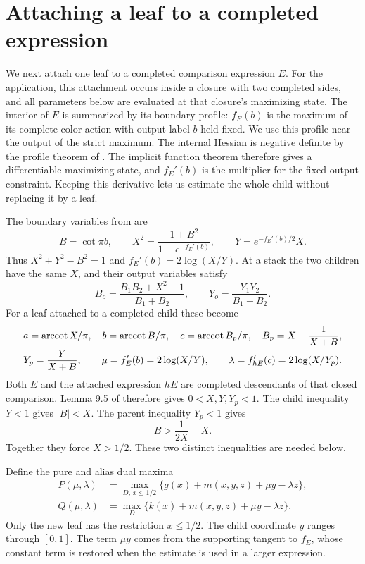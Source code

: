 \section{Attaching a leaf to a completed expression}\label{cs:attachment}

We next attach one leaf to a completed comparison expression $E$.
For the application, this attachment occurs inside a closure with two
completed sides, and all parameters below are evaluated at that
closure's maximizing state.
The interior of $E$ is summarized by its boundary profile: $f_E(b)$ is
the maximum of its complete-color action with output label $b$ held
fixed. We use this profile near the output of the strict maximum.
The internal Hessian is negative definite by the profile theorem of
\cite{Newton}. The implicit function theorem therefore gives a
differentiable maximizing state, and $f_E'(b)$ is the multiplier for
the fixed-output constraint. Keeping this derivative lets us estimate
the whole child without replacing it by a leaf.

The boundary variables from \cite[Section 9]{Newton} are
\[
 B=\cot\pi b,\qquad
 X^2=\frac{1+B^2}{1+e^{-f_E'(b)}},\qquad
 Y=e^{-f_E'(b)/2}X.
\]
Thus $X^2+Y^2-B^2=1$ and $f_E'(b)=2\log(X/Y)$. At a stack the two children have the same $X$, and their output variables satisfy
\[
 B_o=\frac{B_1B_2+X^2-1}{B_1+B_2},
 \qquad Y_o=\frac{Y_1Y_2}{B_1+B_2}.
\]
For a leaf attached to a completed child these become
\begin{equation}\label{cs:attachment-parameters}
 \begin{gathered}
 a=\operatorname{arccot} X/\pi,\quad b=\operatorname{arccot} B/\pi,\quad
 c=\operatorname{arccot} B_p/\pi,\quad B_p=X-\frac1{X+B},\\
 Y_p=\frac{Y}{X+B},\qquad
 \mu=f_E'(b)=2\log(X/Y),\qquad
 \lambda=f_{hE}'(c)=2\log(X/Y_p).
 \end{gathered}
\end{equation}
Both $E$ and the attached expression $hE$ are completed descendants
of that closed comparison. Lemma 9.5 of \cite{Newton} therefore gives $0<X,Y,Y_p<1$. The child inequality $Y<1$ gives $|B|<X$. The parent inequality $Y_p<1$ gives
\[
 B>\frac1{2X}-X.
\]
Together they force $X>1/2$. These two distinct inequalities are needed below.

Define the pure and alias dual maxima
\begin{align}
 P(\mu,\lambda)&=\max_{D,\,x\le1/2}
 \{g(x)+m(x,y,z)+\mu y-\lambda z\},\label{cs:single-P}\\
 Q(\mu,\lambda)&=\max_D
 \{k(x)+m(x,y,z)+\mu y-\lambda z\}.\label{cs:single-Q}
\end{align}
Only the new leaf has the restriction $x\le1/2$. The child coordinate $y$ ranges through $[0,1]$. The term $\mu y$
comes from the supporting tangent to $f_E$, whose constant term is
restored when the estimate is used in a larger expression.

